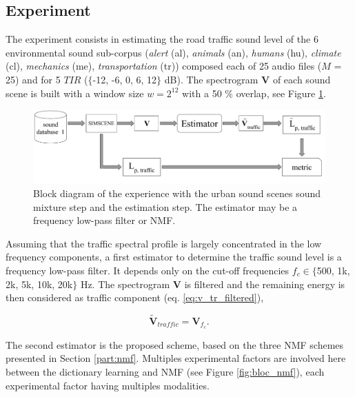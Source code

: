\documentclass[twocolumn,a4paper,10pt]{article}
\begin{document}
\subsection{Experiment}

The experiment consists in estimating the road traffic sound level of the 6 environmental sound sub-corpus (\textit{alert} (al), \textit{animals} (an), \textit{humans} (hu), \textit{climate} (cl), \textit{mechanics} (me), \textit{transportation} (tr)) composed each of 25 audio files ($M$ = 25) and for 5 $TIR$ ($\lbrace$-12, -6, 0, 6, 12$\rbrace$ dB). The spectrogram $\mathbf{V}$ of each sound scene is built with a window size $w = 2^{12}$ with a 50 $\%$ overlap, see Figure \ref{fig:bloc_experiment}.

\begin{figure}
    \centering
    \includegraphics[width=\linewidth]{figures/bloc_diagram_estimator.pdf}
    \caption{Block diagram of the experience with the urban sound scenes sound mixture step and the estimation step. The estimator may be a frequency low-pass filter or NMF.}
    \label{fig:bloc_experiment}
\end{figure}

Assuming that the traffic spectral profile is largely concentrated in the low frequency components, a first estimator to determine the traffic sound level is a frequency low-pass filter. It depends only on the cut-off frequencies $f_c \in  \lbrace$500, 1k, 2k, 5k, 10k, 20k$\rbrace$ Hz. The spectrogram $\mathbf{V}$ is filtered and the remaining energy is then considered as traffic component (eq. \ref{eq:v_tr_filtered}),

\begin{equation}\label{eq:v_tr_filtered}
\mathbf{\tilde{V}}_{traffic} = \mathbf{V}_{f_c}.
\end{equation}

The second estimator is the proposed scheme, based on the three NMF schemes presented in Section \ref{part:nmf}. Multiples experimental factors are involved here between the dictionary learning and NMF (see Figure \ref{fig:bloc_nmf}), each experimental factor having multiples modalities.
\end{document}
